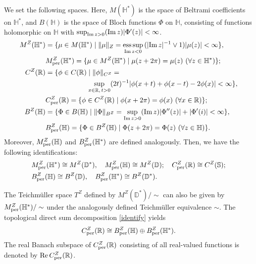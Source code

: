 \documentclass[amstex]{amsart}
\theoremstyle{definition}
\theoremstyle{remark}
\numberwithin{equation}{section}
\begin{document}
We set the following spaces. Here, $M(\mathbb H^*)$ is the space of Beltrami coefficients on $\mathbb H^*$, and
$B(\mathbb H)$ is the space of Bloch functions $\Phi$ on $\mathbb H$,
consisting of functions holomorphic on $\mathbb H$ with $\sup_{{\rm Im}\, z > 0}
({\rm Im}\, z)|\Phi'(z)|<\infty$.
\begin{align*}
M^Z(\mathbb H^*)&=\{ \mu \in M(\mathbb H^*) \mid \Vert \mu \Vert_Z 
= \underset{{\rm Im}\, z < 0}{\mathrm{ess\,sup}}\, (|{\rm Im}\, z|^{-1} \lor 1)|\mu(z)| < \infty \}, \\
&M^Z_{\rm per}(\mathbb H^*) = \{\mu \in M^Z(\mathbb H^*) \mid \mu(z+2\pi) = \mu(z)\ (\forall z \in \mathbb H^*)\}; \\
C^Z(\mathbb R) &= \{\phi \in C(\mathbb R) \mid \Vert \phi \Vert_{C^Z}= \\
&\qquad \qquad \qquad \sup_{x \in \mathbb R,\,t > 0} (2t)^{-1}|\phi(x + t) + \phi(x - t) - 2\phi(x)| < \infty\}, \\
&C^Z_{\rm per}(\mathbb R) = \{\phi \in C^Z(\mathbb R) \mid \phi(x+2\pi) = \phi(x)\ (\forall x \in \mathbb R)\};\\
B^Z(\mathbb H)&=\{ \Phi \in B(\mathbb H) \mid \Vert \Phi \Vert_{B^Z}=\sup_{{\rm Im}\, z > 0}
({\rm Im}\, z)|\Phi''(z)|+|\Phi'(i)|<\infty \},\\
&B^Z_{\rm per}(\mathbb H) =\{ \Phi \in B^Z(\mathbb H) \mid \Phi(z+2\pi) = \Phi(z)\ (\forall z \in \mathbb H)\}.
\end{align*}
Moreover, $M^Z_{\rm per}(\mathbb H)$ and $B^Z_{\rm per}(\mathbb H^*)$ are defined analogously.
Then, we have the following identifications:
\begin{align*}
&M^Z_{\rm per}(\mathbb H^*) \cong M^Z(\mathbb D^*), \quad M^Z_{\rm per}(\mathbb H) \cong M^Z(\mathbb D); \quad
C^Z_{\rm per}(\mathbb R) \cong C^Z(\mathbb S);\\
&B^Z_{\rm per}(\mathbb H) \cong B^Z(\mathbb D), \quad B^Z_{\rm per}(\mathbb H^*) \cong B^Z(\mathbb D^*).
\end{align*}

The Teichm\"uller space $T^Z$ defined by $M^Z(\mathbb D^*)/\sim$ can also be given by
\linebreak
$M^Z_{\rm per}(\mathbb H^*)/\sim$ under the analogously defined Teichm\"uller equivalence $\sim$.
The topological direct sum decomposition \eqref{identify} yields
\begin{equation}\label{decompose}
C^Z_{\rm per}(\mathbb R) \cong B^Z_{\rm per}(\mathbb H) \oplus B^Z_{\rm per}(\mathbb H^*).
\end{equation}
The real Banach subspace of $C^Z_{\rm per}(\mathbb R)$ consisting of all real-valued functions is denoted by
${\rm Re}\, C^Z_{\rm per}(\mathbb R)$.
\end{document}
